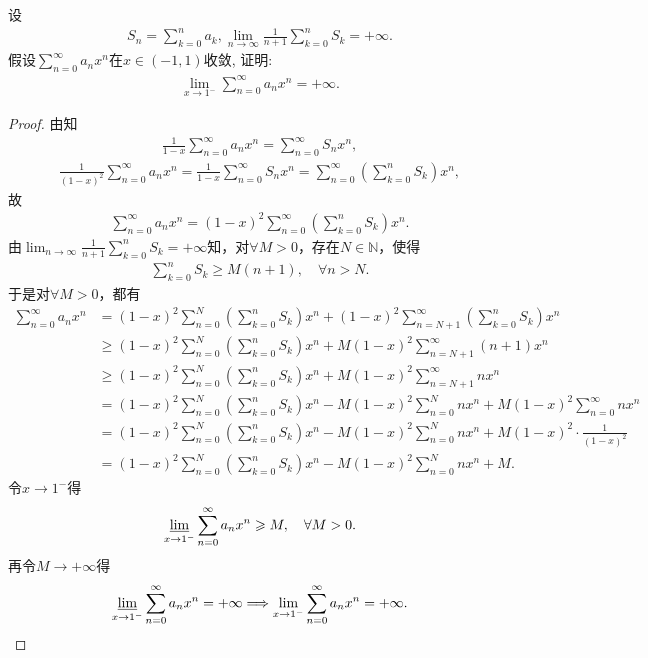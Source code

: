 \documentclass[../../main.tex]{subfiles}
\begin{document}
\begin{example}
设
\begin{align*}
S_n = \sum_{k=0}^n a_k, \lim_{n \to \infty} \frac{1}{n+1} \sum_{k=0}^n S_k = +\infty.
\end{align*}
假设$\sum_{n=0}^\infty a_n x^n$在$x \in (-1,1)$收敛, 证明:
\begin{align*}
\lim_{x \to 1^-} \sum_{n=0}^\infty a_n x^n = +\infty.
\end{align*}
\end{example}
\begin{proof}
由知
\begin{align*}
\frac{1}{1-x}\sum_{n=0}^{\infty}a_nx^n = \sum_{n=0}^{\infty}S_nx^n,
\end{align*}
\begin{align*}
\frac{1}{(1-x)^2}\sum_{n=0}^{\infty}a_nx^n = \frac{1}{1-x}\sum_{n=0}^{\infty}S_nx^n = \sum_{n=0}^{\infty}\left( \sum_{k=0}^n S_k \right)x^n,
\end{align*}
故
\begin{align*}
\sum_{n=0}^{\infty}a_nx^n = (1-x)^2\sum_{n=0}^{\infty}\left( \sum_{k=0}^n S_k \right)x^n.
\end{align*}
由$\lim_{n \to \infty}\frac{1}{n+1}\sum_{k=0}^n S_k = +\infty$知，对$\forall M>0$，存在$N \in \mathbb{N}$，使得
\begin{align*}
\sum_{k=0}^n S_k \geqslant M(n+1), \quad \forall n>N.
\end{align*}
于是对$\forall M>0$，都有
\begin{align*}
\sum_{n=0}^{\infty}a_nx^n &= (1-x)^2\sum_{n=0}^N\left( \sum_{k=0}^n S_k \right)x^n + (1-x)^2\sum_{n=N+1}^{\infty}\left( \sum_{k=0}^n S_k \right)x^n \\
&\geqslant (1-x)^2\sum_{n=0}^N\left( \sum_{k=0}^n S_k \right)x^n + M(1-x)^2\sum_{n=N+1}^{\infty}(n+1)x^n \\
&\geqslant (1-x)^2\sum_{n=0}^N\left( \sum_{k=0}^n S_k \right)x^n + M(1-x)^2\sum_{n=N+1}^{\infty}nx^n \\
&= (1-x)^2\sum_{n=0}^N\left( \sum_{k=0}^n S_k \right)x^n - M(1-x)^2\sum_{n=0}^N nx^n + M(1-x)^2\sum_{n=0}^{\infty}nx^n \\
&= (1-x)^2\sum_{n=0}^N\left( \sum_{k=0}^n S_k \right)x^n - M(1-x)^2\sum_{n=0}^N nx^n + M(1-x)^2 \cdot \frac{1}{(1-x)^2} \\
&= (1-x)^2\sum_{n=0}^N\left( \sum_{k=0}^n S_k \right)x^n - M(1-x)^2\sum_{n=0}^N nx^n + M.
\end{align*}
令$x \to 1^-$得
\begin{align*}
\varliminf_{x \to 1^-}\sum_{n=0}^{\infty}a_nx^n \geqslant M,\quad \forall M>0.
\end{align*}
再令$M \to +\infty$得
\begin{align*}
\varliminf_{x \to 1^-}\sum_{n=0}^{\infty}a_nx^n = +\infty \Longrightarrow \lim_{x \to 1^-}\sum_{n=0}^{\infty}a_nx^n = +\infty.
\end{align*}

\end{proof}
\end{document}
